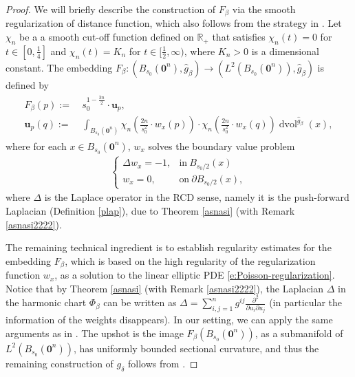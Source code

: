 \documentclass[11pt,reqno]{amsart}
\theoremstyle{definition}
\numberwithin{equation}{section}
\newcommand{\dR}{\mathbb{R}}
\newcommand{\p}{\partial}
\DeclareMathOperator{\dvol}{dvol}
\begin{document}
\begin{proof}
We will briefly describe the construction of $F_{\beta}$ via the smooth regularization of  distance function, which also follows from the strategy in \cite[Section 4]{PWY}. 
Let $\chi_n$ be a 
a smooth cut-off function 
defined on $\dR_+$ that satisfies $\chi_n(t) = 0$ for 
$t\in [0, \frac{1}{4}]$
and $\chi_n(t) = K_n$ for $t\in [\frac{1}{2},\infty)$, where   $K_n > 0$ is a dimensional constant. The embedding $F_{\beta}: (B_{s_0}(\bm{0}^n), \hat{g}_{\beta}) \to  (L^2(B_{s_0}(\bm{0}^n)), \hat{g}_{\beta})$
is defined by 
\begin{align}
\begin{split}
F_{\beta}(p) 
:= & \ s_0^{1- \frac{3n}{2}}  \cdot \bm{u}_p,
\\
\bm{u}_p (q)
:= & \ \int_{B_{s_0}(\bm{0}^n)}
\chi_n \left( \frac{2n}{s_0^2} \cdot w_x(p) \right) \cdot \chi_n \left( \frac{2n}{s_0^2} \cdot w_x(q) \right) \dvol^{\hat{g}_{\beta}}(x),
\end{split}
\end{align}
where for each $x\in B_{s_0}(\bm{0}^n)$, $w_x$ solves the boundary value problem 
\begin{align}\label{e:Poisson-regularization}
\begin{cases}
\Delta w_x =  - 1, & \text{in} \ B_{s_0/2}(x)
\\
w_x  =  0 , & \text{on} \ \p B_{s_0/2}(x),
\end{cases}
\end{align}
where $\Delta$ is the Laplace operator in the RCD sense, namely it is the push-forward Laplacian (Definition \ref{plap}), due to Theorem \ref{asnasi} (with Remark \ref{asnasi2222}).


The remaining technical ingredient is to 
establish 
 regularity estimates for the embedding $F_{\beta}$, which is based on the high regularity of the regularization function $w_x$, as a solution to the linear elliptic PDE \eqref{e:Poisson-regularization}. Notice that by Theorem \ref{asnasi} (with Remark \ref{asnasi2222}), the Laplacian $\Delta$ in the harmonic chart $\Phi_{\beta}$ can be written as $\Delta = \sum_{i, j=1}^ng^{ij} \frac{\p^2}{\p u_i \p u_j}$ (in particular the information of the weights disappears). In our setting, we can  apply the same arguments as in \cite[Sections 4 and 5]{PWY}.
The upshot is the image $F_{\beta}( B_{s_0}(\bm{0}^n) )$, as a submanifold of $L^2(  B_{s_0}(\bm{0}^n) )$, has uniformly bounded sectional curvature, and thus the remaining construction of $g_{\delta}$ follows from \cite{Abresch}. 
\end{proof}
\end{document}
